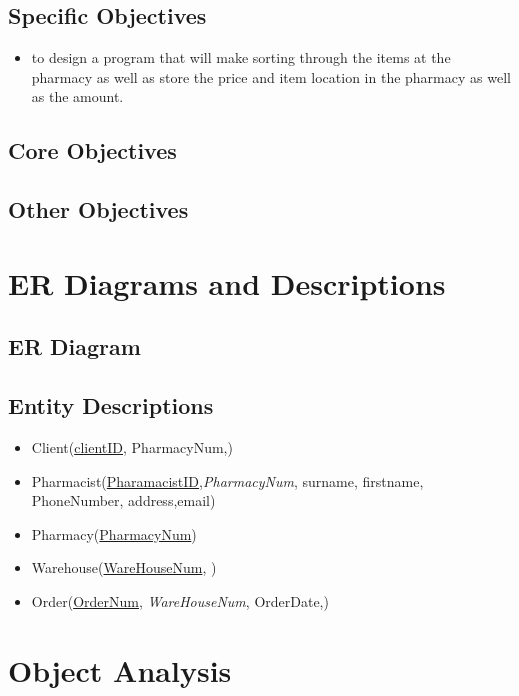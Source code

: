 \subsection{Specific Objectives}
\begin{itemize}
	\item to design a program that will make sorting through the items at the pharmacy as well as store the price and item location in the pharmacy as well as the amount.
\end{itemize}
\subsection{Core Objectives}

\subsection{Other Objectives}

\section{ER Diagrams and Descriptions}

\subsection{ER Diagram}

\subsection{Entity Descriptions}
\begin{itemize}

\item Client(\underline{clientID}, PharmacyNum,)

\item Pharmacist(\underline{PharamacistID},\emph{PharmacyNum}, surname, firstname, PhoneNumber, address,email)

\item Pharmacy(\underline{PharmacyNum})

\item Warehouse(\underline{WareHouseNum}, )

\item Order(\underline{OrderNum}, \emph{WareHouseNum}, OrderDate,)
\end{itemize}
\section{Object Analysis}

